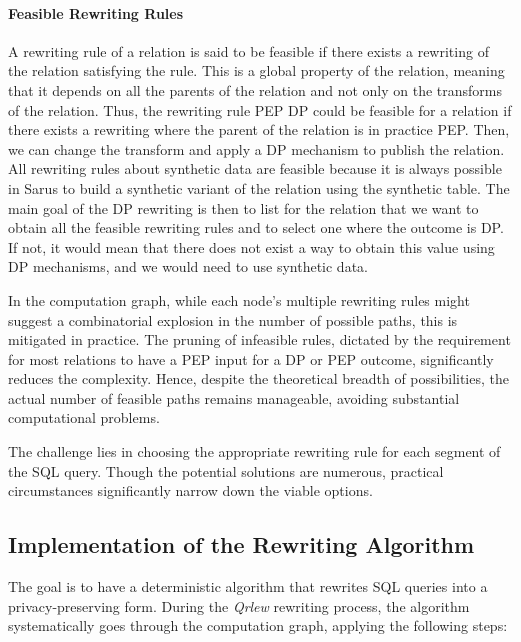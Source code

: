 \documentclass[letterpaper]{article} %
\newcommand{\qrlew}{\emph{Qrlew}}
\begin{document}
\paragraph{Feasible Rewriting Rules}
A rewriting rule of a relation is said to be feasible if there exists a rewriting of the relation satisfying the rule. This is a global property of the relation, meaning that it depends on all the parents of the relation and not only on the transforms of the relation. Thus, the rewriting rule PEP \textrightarrow{} DP could be feasible for a relation if there exists a rewriting where the parent of the relation is in practice PEP. Then, we can change the transform and apply a DP mechanism to publish the relation. All rewriting rules about synthetic data are feasible because it is always possible in Sarus to build a synthetic variant of the relation using the synthetic table. The main goal of the DP rewriting is then to list for the relation that we want to obtain all the feasible rewriting rules and to select one where the outcome is DP. If not, it would mean that there does not exist a way to obtain this value using DP mechanisms, and we would need to use synthetic data.

In the computation graph, while each node's multiple rewriting rules might suggest a combinatorial explosion in the number of possible paths, this is mitigated in practice. The pruning of infeasible rules, dictated by the requirement for most relations to have a PEP input for a DP or PEP outcome, significantly reduces the complexity. Hence, despite the theoretical breadth of possibilities, the actual number of feasible paths remains manageable, avoiding substantial computational problems.

The challenge lies in choosing the appropriate rewriting rule for each segment of the SQL query. Though the potential solutions are numerous, practical circumstances significantly narrow down the viable options.

\subsection{Implementation of the Rewriting Algorithm}

The goal is to have a deterministic algorithm that rewrites SQL queries into a privacy-preserving form. During the \qrlew{} rewriting process, the algorithm systematically goes through the computation graph, applying the following steps:
\end{document}
